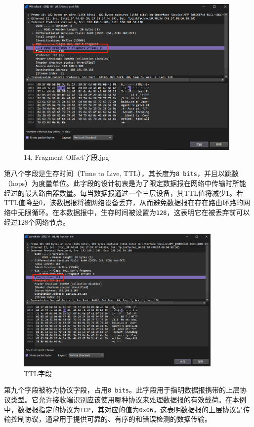 \documentclass{article}
\begin{document}
	\begin{figure}[H]
		\centering
		\includegraphics[width=11cm]{images/14. Fragment Offset字段.jpg}
		\caption{14. Fragment Offset字段.jpg}
	\end{figure}
	
	第八个字段是生存时间（Time to Live, TTL），其长度为\texttt{8 bits}，并且以跳数（hops）为度量单位。此字段的设计初衷是为了限定数据报在网络中传输时所能经过的最大路由器数量。每当数据报通过一个三层设备，其TTL值将减少1。若TTL值降至0，该数据报将被网络设备丢弃，从而避免数据报在存在路由环路的网络中无限循环。在本数据报中，生存时间被设置为\texttt{128}，这表明它在被丢弃前可以经过128个网络节点。
	
	\begin{figure}[H]
		\centering
		\includegraphics[width=10cm]{images/15. TTL字段.jpg}
		\caption{TTL字段}
	\end{figure}
	
	第九个字段被称为协议字段，占用\texttt{8 bits}。此字段用于指明数据报携带的上层协议类型。它允许接收端识别应该使用哪种协议来处理数据报的有效载荷。在本例中，数据报指定的协议为\texttt{TCP}，其对应的值为\texttt{0x06}，这表明数据报的上层协议是传输控制协议，通常用于提供可靠的、有序的和错误检测的数据传输。
	
\end{document}
